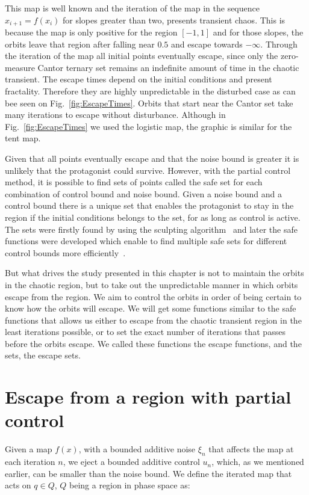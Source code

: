 This map is well known and the iteration of the map in the sequence $x_{i+1} = f(x_i)$ for slopes greater than two, presents transient chaos. This is because the map is only positive for the region $[-1,1]$ and for those slopes, the orbits leave that region after falling near $0.5$ and escape towards $-\infty$. Through the iteration of the map all initial points eventually escape, since only the zero-measure Cantor ternary set remains an indefinite amount of time in the chaotic transient. The escape times depend on the initial conditions and present fractality. Therefore they are highly unpredictable in the disturbed case as can bee seen on Fig.~\ref{fig:EscapeTimes}. Orbits that start near the Cantor set take many iterations to escape without disturbance. Although in Fig.~\ref{fig:EscapeTimes} we used the logistic map, the graphic is similar for the tent map.

Given that all points eventually escape and that the noise bound is greater it is unlikely that the protagonist could survive. However, with the partial control method, it is possible to find sets of points called the safe set for each combination of control bound and noise bound. Given a noise bound and a control bound there is a unique set that enables the protagonist to stay in the region if the initial conditions belongs to the set, for as long as control is active. The sets were firstly found by using the sculpting algorithm~\cite{Sculpting} and later the safe functions were developed which enable to find multiple safe sets for different control bounds more efficiently~\cite{SafeSets}.

But what drives the study presented in this chapter is not to maintain the orbits in the chaotic region, but to take out the unpredictable manner in which orbits escape from the region. We aim to control the orbits in order of being certain to know how the orbits will escape. We will get some functions similar to the safe functions that allows us either to escape from the chaotic transient region in the least iterations possible, or to set the exact number of iterations that passes before the orbits escape. We called these functions the escape functions, and the sets, the escape sets.
 
\section{Escape from a region with partial control}

Given a map $f(x)$, with a bounded additive noise $\xi_n$ that affects the map at each iteration $n$, we eject a bounded additive control $u_n$, which, as we mentioned earlier, can be smaller than the noise bound. We define the iterated map that acts on $q\in Q$, $Q$ being a region in phase space as:

